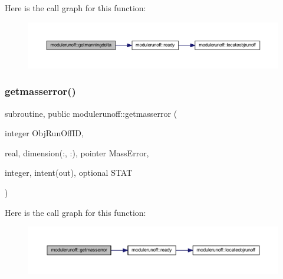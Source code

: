 Here is the call graph for this function\+:
\nopagebreak
\begin{figure}[H]
\begin{center}
\leavevmode
\includegraphics[width=350pt]{namespacemodulerunoff_a9ca63f5612ab734b77497c2eca2c05bd_cgraph}
\end{center}
\end{figure}
\mbox{\label{namespacemodulerunoff_a9dff5ff4c2ef0ce7078dd08d46ddeb4b}} 
\subsubsection{\texorpdfstring{getmasserror()}{getmasserror()}}
{\footnotesize\ttfamily subroutine, public modulerunoff\+::getmasserror (\begin{DoxyParamCaption}\item[{integer}]{Obj\+Run\+Off\+ID,  }\item[{real, dimension(\+:, \+:), pointer}]{Mass\+Error,  }\item[{integer, intent(out), optional}]{S\+T\+AT }\end{DoxyParamCaption})}

Here is the call graph for this function\+:
\nopagebreak
\begin{figure}[H]
\begin{center}
\leavevmode
\includegraphics[width=350pt]{namespacemodulerunoff_a9dff5ff4c2ef0ce7078dd08d46ddeb4b_cgraph}
\end{center}
\end{figure}
\mbox{\label{namespacemodulerunoff_a364cfd3bda8ba61cda13d20f848f20dc}} 
